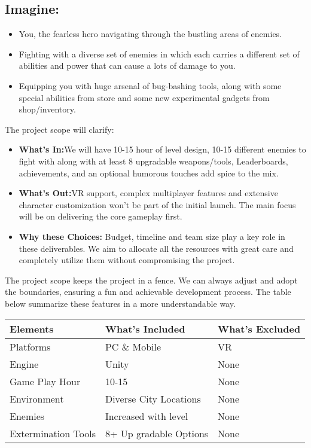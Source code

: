\subsection{Imagine:}
\begin{itemize}
\item 	You, the fearless hero navigating through the bustling areas of enemies.
\item Fighting with a diverse set of enemies in which each carries a  different set of abilities and power that can cause a lots of damage to you.
\item 	Equipping you with huge arsenal of bug-bashing tools, along with some special abilities from store and some new experimental gadgets from shop/inventory.
\end{itemize}
The project scope will clarify:
\begin{itemize}
	\item \textbf{What’s In:}We will have 10-15 hour of level design, 10-15 different enemies to fight with along with at least 8 upgradable  weapons/tools, Leaderboards, achievements, and an optional humorous touches add spice to the mix.
	\item \textbf{What's Out:}VR support, complex multiplayer features and extensive character customization won’t be part of the initial launch. The main focus will be on delivering the core gameplay first.
	\item \textbf{Why these Choices:} Budget, timeline and team size play a key role in these deliverables. We aim to allocate all the resources with great care and completely utilize them without compromising the project.
\end{itemize}
The project scope keeps the project in a fence. We can always adjust and adopt the boundaries, ensuring a fun and achievable development process. The table below summarize these features in a more understandable way.

\begin{tabular}{l|l|l}

\textbf{Elements}& \textbf{ What's Included} & \textbf{ What's Excluded} \\
\hline
Platforms & PC \& Mobile & VR \\ 
\hline
Engine & Unity & None \\
\hline
Game Play Hour & 10-15 & None \\
\hline
Environment & Diverse City Locations & None \\
\hline
Enemies & Increased with level & None \\
\hline
Extermination Tools & 8+ Up gradable Options & None \\
\hline

\end{tabular}


